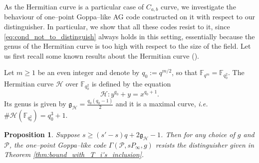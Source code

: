 \documentclass[a4paper]{amsart}
\newtheorem{proposition}[thm]{Proposition}
\theoremstyle{definition}
\theoremstyle{remark}
\newcommand{\calP}{\mathcal{P}}
\newcommand{\calH}{\mathcal{H}}
\newcommand{\fqm}{\mathbb{F}_{q^m}}
\newcommand{\fqo}{\mathbb{F}_{q_0^2}}
\begin{document}
As the Hermitian curve is a particular case of $C_{a,b}$ curve, we investigate the behaviour of one--point Goppa--like AG code constructed on it with respect to our distinguisher.
In particular, we show that all these codes resist to it, since  \eqref{eq:cond_not_to_distinguish} always holds in this setting, essentially because the genus of the Hermitian curve is too high with respect to the size of the field. Let us first recall some known results about the Hermitian curve (\cite{Sti09}). 

Let $m \geq 1$  be an even integer and denote by $q_0 := q^{m/2}$, so that $\fqm = \fqo$. The Hermitian curve $\calH$ over $\fqo$ is defined by the equation
$$\calH : y^{q_0}+y = x^{q_0+1}.$$
Its genus is given by $\mathfrak{g}_{\calH} = \frac{q_0(q_0-1)}{2}$ and it is a maximal curve, \emph{i.e.} $\#\calH(\fqo) = q_0^3+1$.

\begin{proposition} \label{prop:Hermitian_Goppa_like_are_secured}
    Suppose $s \geq (s'-s)q+2\mathfrak{g}_{\calH}-1$. Then for any choice of $g$ and $\calP$, the one--point Goppa--like code $\Gamma(\calP,sP_\infty,g)$ resists the distinguisher given in Theorem \ref{thm:bound_with_T_i's_inclusion}.
\end{proposition}
\end{document}
